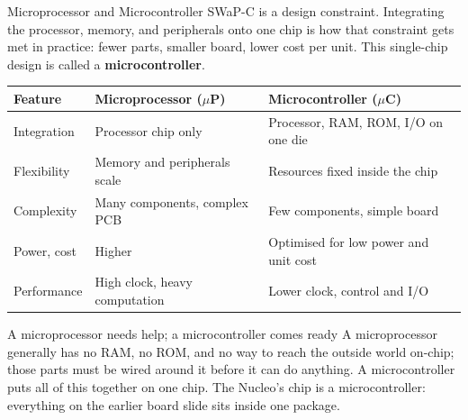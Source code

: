 \documentclass[9pt,aspectratio=169,xcolor=table]{beamer}
\newcommand{\striped}{\rowcolors{1}{white}{stripe}}
\begin{document}
\begin{frame}{Microprocessor and Microcontroller}
	\leavevmode
	{\small SWaP-C is a design constraint. Integrating the processor,
		memory, and peripherals onto \alert{one chip} is how that
		constraint gets met in practice: fewer parts, smaller board,
		lower cost per unit. This single-chip design is called a
		\textbf{microcontroller}.}

	\vspace{2mm}
	\begin{center}
		{\small
			\striped
			\begin{tabular}{@{}l l l@{}}
				\toprule
				\textbf{Feature} & \textbf{Microprocessor ($\mu$P)} & \textbf{Microcontroller ($\mu$C)} \\
				\midrule
				Integration  & Processor chip only & Processor, RAM, ROM, I/O on one die \\
				Flexibility  & Memory and peripherals scale & Resources fixed inside the chip \\
				Complexity   & Many components, complex PCB & Few components, simple board \\
				Power, cost  & Higher & Optimised for low power and unit cost \\
				Performance  & High clock, heavy computation & Lower clock, control and I/O \\
				\bottomrule
		\end{tabular}}
	\end{center}

	\vspace{3mm}
	\begin{block}{A microprocessor needs help; a microcontroller comes ready}
		A microprocessor generally has no RAM, no ROM, and no way to
		reach the outside world on-chip; those parts must be wired
		around it before it can do anything. A microcontroller puts
		all of this together on one chip. \alert{The Nucleo's chip is
			a microcontroller}: everything on the earlier board slide
		sits inside one package.
	\end{block}

\end{frame}
\end{document}
